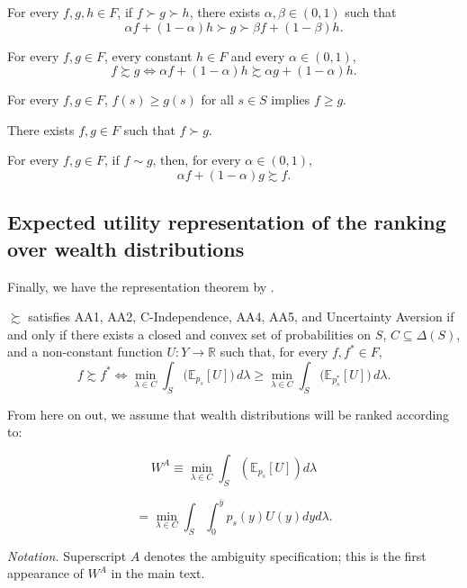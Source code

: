 \documentclass[Chp3.tex]{subfiles}
\begin{document}
\begin{ax.AA}[Continuity]
For every $f,g,h \in F$,  if $f \succ g \succ h $, there exists $\alpha, \beta \in (0,1)$ such that 
$$ \alpha f + (1-\alpha) h \succ g \succ \beta f + (1-\beta) h .$$ 
\end{ax.AA}

\begin{ax.C}[C-Independence]
For every $f,g \in F$, every constant $h \in F$ and every $\alpha \in (0,1)$,
$$ f \succsim g \iff \alpha f + (1-\alpha)h \succsim \alpha g + (1-\alpha)h. $$
\end{ax.C}

\begin{ax.AA}[Monotonicity]
For every $f,g \in F$, $f(s) \geq g(s)$ for all $s \in S$ implies $f \geq g$.
\end{ax.AA}

\begin{ax.AA}
There exists $f,g \in F$ such that $f \succ g$.
\end{ax.AA}

\begin{ax.U}
For every $f,g \in F$, if $f \sim g$, then, for every $\alpha \in (0,1)$,
$$ \alpha f + (1-\alpha)g \succsim f. $$
\end{ax.U}

\subsection{Expected utility representation of the ranking over wealth distributions}

\par  Finally, we have the representation theorem by \cite{gs89}.

\begin{tm}
$\succsim$ satisfies AA1, AA2, C-Independence, AA4, AA5, and Uncertainty Aversion if and only if there exists a closed and convex set of probabilities on $S$, $C \subseteq \Delta(S)$, and a non-constant function $U: Y \to \mathbb{R}$ such that, for every $f, f^* \in F$,
\[
f \succsim f^*
\iff
\min_{\lambda \in C} \int_{S} \big(\mathbb{E}_{p_s}[U]\big)\, d\lambda
\ge
\min_{\lambda \in C} \int_{S} \big(\mathbb{E}_{p_s^*}[U]\big)\, d\lambda.
\]
\end{tm}

From here on out, we assume that wealth distributions will be ranked according to:

$$ W^{A} \equiv \min_{\lambda \in C} \int_{S} (\mathbb{E}_{p_s}[U]) d \lambda $$

$$ = \min_{\lambda \in C} \int_{S} \int_{0}^{\bar{y}} p_s(y) U(y) dy d\lambda. $$

\par \textit{Notation.} Superscript $A$ denotes the ambiguity specification; this is the first appearance of $W^{A}$ in the main text.
\end{document}
